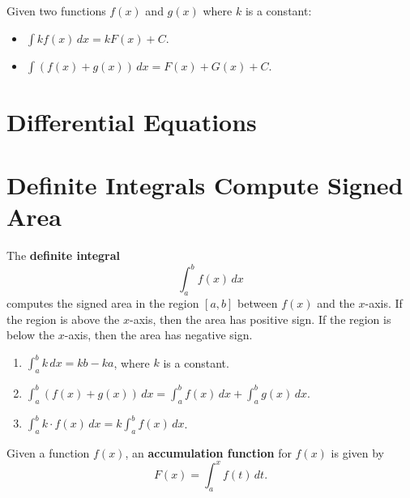 \documentclass{ximera}
\renewcommand{\d}{\,d}
\begin{document}
\begin{theorem}\label{theorem:SRA}
Given two functions $f(x)$ and $g(x)$ where $k$ is a constant:
\begin{itemize}
\item $\int k f(x) \d x= kF(x) + C$.
\item $\int \left(f(x) + g(x)\right) \d x = F(x) + G(x) + C$.
\end{itemize}
\end{theorem}






\section{Differential Equations}







\section{Definite Integrals Compute Signed Area}





\begin{definition}
The \textbf{definite integral}
\[
\int_a^b f(x) \d x
\]
computes the signed area in the region $[a,b]$ between $f(x)$ and the
$x$-axis. If the region is above the $x$-axis, then the area has
positive sign. If the region is below the $x$-axis, then the area has
negative sign.
\end{definition}


\begin{theorem}
\begin{enumerate}
\item $\int_a^b k \d x= kb-ka$, where $k$ is a constant.
\item $\int_a^b \left( f(x) + g(x) \right) \d x = \int_a^b f(x) \d x + \int_a^b
g(x) \d x$.
\item $\int_a^b k \cdot f(x) \d x = k \int_a^b f(x) \d x$.
\end{enumerate}
\end{theorem}



\begin{definition} %
Given a function $f(x)$, an \textbf{accumulation function} for
$f(x)$ is given by
\[
F(x) = \int_a^x f(t) \d t.
\]
\end{definition}
\end{document}
